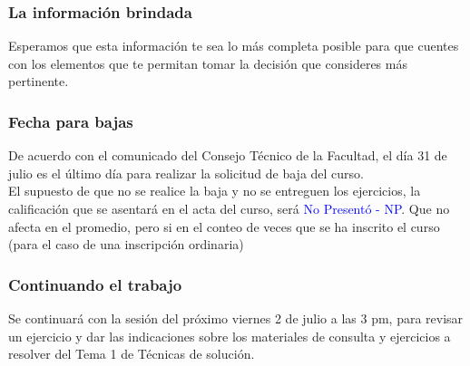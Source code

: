 \documentclass[12pt]{beamer}
\begin{document}
\begin{frame}
\frametitle{La información brindada}
Esperamos que esta información te sea lo más completa posible para que cuentes con los elementos que te permitan tomar la decisión que consideres más pertinente.
\end{frame}
\begin{frame}
\frametitle{Fecha para bajas}
De acuerdo con el comunicado del Consejo Técnico de la Facultad, el día 31 de julio es el último día para realizar la solicitud de baja del curso.
\\
\bigskip
\pause
El supuesto de que no se realice la baja y no se entreguen los ejercicios, la calificación que se asentará en el acta del curso, será \textcolor{blue}{No Presentó -  NP}. \pause Que no afecta en el promedio, pero si en el conteo de veces que se ha inscrito el curso (para el caso de una inscripción ordinaria)
\end{frame}
\begin{frame}
\frametitle{Continuando el trabajo}
Se continuará con la sesión del próximo viernes 2 de julio a las 3 pm, para revisar un ejercicio y dar las indicaciones sobre los materiales de consulta y ejercicios a resolver del Tema 1 de Técnicas de solución.
\end{frame}
\end{document}
